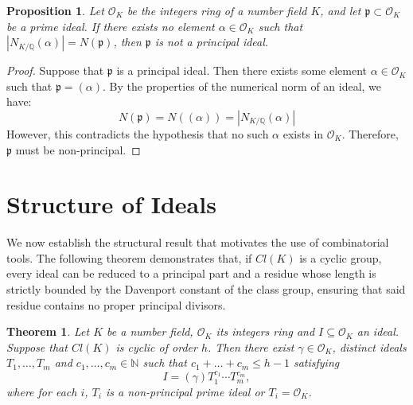 \documentclass[11pt]{article}
\newtheorem{theorem}{Theorem}
\newtheorem{proposition}{Proposition}
\theoremstyle{definition}
\begin{document}
\begin{proposition}\label{princi}
Let $\mathcal{O}_K$ be the integers ring of a number field $K$, and let $\mathfrak{p} \subset \mathcal{O}_K$ be a prime ideal. If there exists no element $\alpha \in \mathcal{O}_K$ such that $|N_{K/\mathbb{Q}}(\alpha)| = N(\mathfrak{p})$, then $\mathfrak{p}$ is not a principal ideal.
\end{proposition}

\begin{proof}
Suppose that $\mathfrak{p}$ is a principal ideal. Then there exists some element $\alpha \in \mathcal{O}_K$ such that $\mathfrak{p} = (\alpha)$. By the properties of the numerical norm of an ideal, we have:
\[
N(\mathfrak{p}) = N((\alpha)) = |N_{K/\mathbb{Q}}(\alpha)|
\]
However, this contradicts the hypothesis that no such $\alpha$ exists in $\mathcal{O}_K$. Therefore, $\mathfrak{p}$ must be non-principal.
\end{proof}



\section{Structure of Ideals}

We now establish the structural result that motivates the use of combinatorial tools. The following theorem demonstrates that, if $Cl(K)$ is a cyclic group, every ideal can be reduced to a principal part and a residue whose length is strictly bounded by the Davenport constant of the class group, ensuring that said residue contains no proper principal divisors.

\begin{theorem}\label{teoprinc}
Let $K$ be a number field, $\mathcal{O}_K$ its integers ring and $I \subseteq \mathcal{O}_K$ an ideal. Suppose that $Cl(K)$ is cyclic of order $h$. Then there exist $\gamma \in \mathcal{O}_K$, distinct ideals $T_1, \dots, T_{m}$ and $c_1,\ldots,c_m\in\mathbb{N}$ such that $c_1+\ldots+c_m\leq h-1$ satisfying
\[ I = (\gamma) T_1^{c_1} \cdots T_{m}^{c_m}, \]
where for each $i$, $T_i$ is a non-principal prime ideal or $T_i=\mathcal{O}_K$.
\end{theorem}
\end{document}
